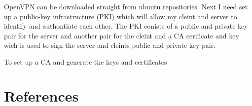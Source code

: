 \documentclass[12pt,a4paper,oneside]{article}
\begin{document}
OpenVPN can be downloaded straight from ubuntu repositories. Next I need set up a public-key infrastructure (PKI) which will allow my cleint and server to identify and authontiate each other. The PKI conists of a public and private key pair for the server and another pair for the cleint and a CA cerificate and key wich is used to sign the server and cleints public and private key pair. 

To set up a CA and generate the keys and certificates


\section{References}
\end{document}
